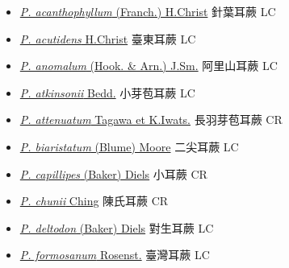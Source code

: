 \begin{itemize}
  \begin{itemize}
        \item[] \href{http://www.theplantlist.org/tpl1.1/search?q=Polystichum+acanthophyllum}{\textit{P. acanthophyllum} (Franch.) H.Christ}   針葉耳蕨   LC
        \item[] \href{http://www.theplantlist.org/tpl1.1/search?q=Polystichum+acutidens}{\textit{P. acutidens} H.Christ}   臺東耳蕨   LC
        \item[] \href{http://www.theplantlist.org/tpl1.1/search?q=Polystichum+anomalum}{\textit{P. anomalum} (Hook. \& Arn.) J.Sm.}   阿里山耳蕨   LC
        \item[] \href{http://www.theplantlist.org/tpl1.1/search?q=Polystichum+atkinsonii}{\textit{P. atkinsonii} Bedd.}   小芽苞耳蕨   LC
        \item[] \href{http://www.theplantlist.org/tpl1.1/search?q=Polystichum+attenuatum}{\textit{P. attenuatum} Tagawa et K.Iwats.}   長羽芽苞耳蕨   CR
        \item[] \href{http://www.theplantlist.org/tpl1.1/search?q=Polystichum+biaristatum}{\textit{P. biaristatum} (Blume) Moore}   二尖耳蕨   LC
        \item[] \href{http://www.theplantlist.org/tpl1.1/search?q=Polystichum+capillipes}{\textit{P. capillipes} (Baker) Diels}   小耳蕨   CR
        \item[] \href{http://www.theplantlist.org/tpl1.1/search?q=Polystichum+chunii}{\textit{P. chunii} Ching}   陳氏耳蕨   CR
        \item[] \href{http://www.theplantlist.org/tpl1.1/search?q=Polystichum+deltodon}{\textit{P. deltodon} (Baker) Diels}   對生耳蕨   LC
        \item[] \href{http://www.theplantlist.org/tpl1.1/search?q=Polystichum+formosanum}{\textit{P. formosanum} Rosenst.}   臺灣耳蕨   LC

\end{itemize}
\end{itemize}
